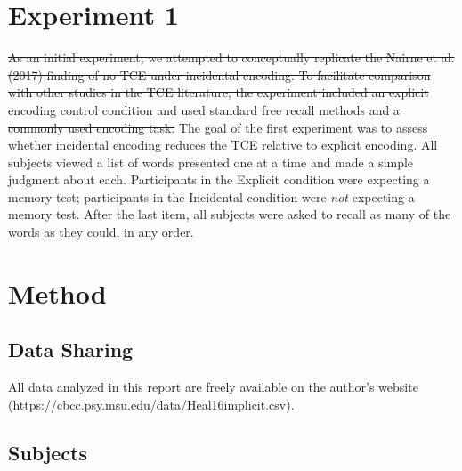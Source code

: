\documentclass[man,natbib,floatsintext]{apa6} %
\begin{document}
\section{Experiment 1}
\st{As an initial experiment, we attempted to conceptually replicate the Nairne et al. (2017) finding of no TCE under incidental encoding. To facilitate comparison with other studies in the TCE literature, the experiment included an explicit encoding control condition and used standard free recall methods and a commonly used encoding task.}
\color{red}
The goal of the first experiment was to assess whether incidental encoding reduces the TCE relative to explicit encoding. All subjects viewed a list of words presented one at a time and made a simple judgment about each. Participants in the Explicit condition were expecting a memory test; participants in the Incidental condition were \emph{not} expecting a memory test.  After the last item, all subjects were asked to recall as many of the words as they could, in any order. 
\color{black}

\section{Method}

\newcommand\listlength{16} %
\newcommand\presrate{4 seconds} %
\newcommand\isi{1 second} %
\newcommand\DFRDelay{16 second} %
\newcommand\recalltime{75 seconds} %
\newcommand\totalss{XX}
\newcommand\totalexcluded{XX}



\subsection{Data Sharing}All data analyzed in this report are freely available on the author's website (https://cbcc.psy.msu.edu/data/Heal16implicit.csv).

\subsection{Subjects}
\end{document}
